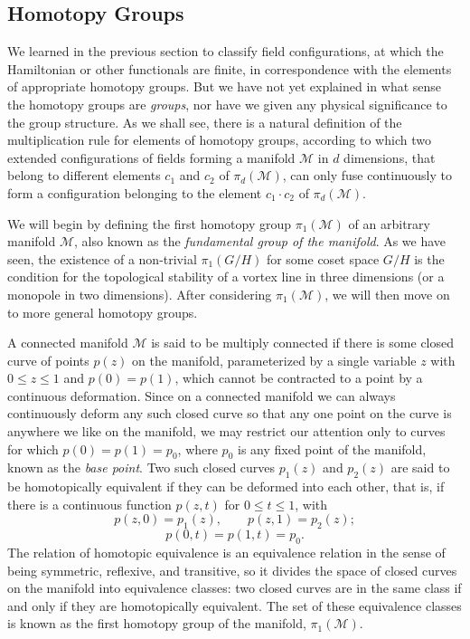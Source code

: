 \subsection{Homotopy Groups}
\label{sec:23.2}

We learned in the previous section to classify field configurations, at
which the Hamiltonian or other functionals are finite, in correspondence
with the elements of appropriate homotopy groups. But we have not yet
explained in what sense the homotopy groups are \emph{groups}, nor have
we given any physical significance to the group structure. As we shall see,
there is a natural definition of the multiplication rule for elements of
homotopy groups, according to which two extended configurations of fields
forming a manifold $\mathcal M$ in $d$ dimensions, that belong to different
elements $c_1$ and $c_2$ of $\pi_d(\mathcal M)$, can only fuse continuously
to form a configuration belonging to the element $c_1\cdot c_2$ of
$\pi_d(\mathcal M)$.

We will begin by defining the first homotopy group $\pi_1(\mathcal M)$ of
an arbitrary manifold $\mathcal M$, also known as the \emph{fundamental
group of the manifold}. As we have seen, the existence of a non-trivial
$\pi_1(G/H)$ for some coset space $G/H$ is the condition for the
topological stability of a vortex line in three dimensions (or a monopole
in two dimensions). After considering $\pi_1(\mathcal M)$, we will then
move on to more general homotopy groups.

A connected manifold $\mathcal M$ is said to be multiply connected if
there is some closed curve of points $p(z)$ on the manifold, parameterized
by a single variable $z$ with $0\leq z\leq1$ and $p(0)=p(1)$, which cannot
be contracted to a point by a continuous deformation. Since on a connected
manifold we can always continuously deform any such closed curve so that
any one point on the curve is anywhere we like on the manifold, we may
restrict our attention only to curves for which
$p(0)=p(1)=p_0$, where $p_0$ is any fixed point of the manifold, known as
the \emph{base point}. Two such closed curves $p_1(z)$ and $p_2(z)$ are
said to be homotopically equivalent if they can be deformed into each
other, that is, if there is a continuous function $p(z,t)$ for
$0\leq t\leq1$, with
\[
 p(z,0)=p_1(z),\qquad p(z,1)=p_2(z);
\]
\[
 p(0,t)=p(1,t)=p_0.
\]
The relation of homotopic equivalence is an equivalence relation in the
sense of being symmetric, reflexive, and transitive, so it divides the
space of closed curves on the manifold into equivalence classes: two
closed curves are in the same class if and only if they are homotopically
equivalent. The set of these equivalence classes is known as the first
homotopy group of the manifold, $\pi_1(\mathcal M)$.

